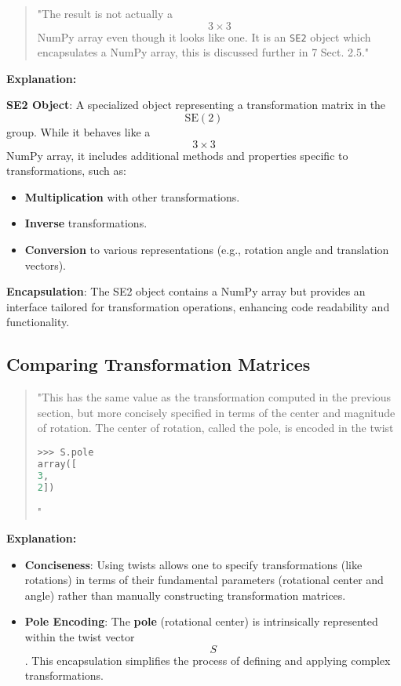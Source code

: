 \documentclass[12pt]{article}
\begin{document}
\begin{quote}
"The result is not actually a $$3 \times 3$$ NumPy array even though it looks like one. It is an \texttt{SE2} object which encapsulates a NumPy array, this is discussed further in 7 Sect. 2.5."
\end{quote}

\textbf{Explanation:}

\textbf{SE2 Object}: A specialized object representing a transformation matrix in the $$\text{SE}(2)$$ group. While it behaves like a $$ 3 \times 3 $$ NumPy array, it includes additional methods and properties specific to transformations, such as:
\begin{itemize}
    \item \textbf{Multiplication} with other transformations.
    \item \textbf{Inverse} transformations.
    \item \textbf{Conversion} to various representations (e.g., rotation angle and translation vectors).
\end{itemize}

\textbf{Encapsulation}: The SE2 object contains a NumPy array but provides an interface tailored for transformation operations, enhancing code readability and functionality.

\subsection{Comparing Transformation Matrices}

\begin{quote}
"This has the same value as the transformation computed in the previous section, but more concisely specified in terms of the center and magnitude of rotation. The center of rotation, called the pole, is encoded in the twist
\begin{lstlisting}[language=Python]
>>> S.pole
array([
3,
2])
\end{lstlisting}"
\end{quote}

\textbf{Explanation:}

\begin{itemize}
    \item \textbf{Conciseness}: Using twists allows one to specify transformations (like rotations) in terms of their fundamental parameters (rotational center and angle) rather than manually constructing transformation matrices.
    
    \item \textbf{Pole Encoding}: The \textbf{pole} (rotational center) is intrinsically represented within the twist vector $$ S $$. This encapsulation simplifies the process of defining and applying complex transformations.
\end{itemize}
\end{document}
